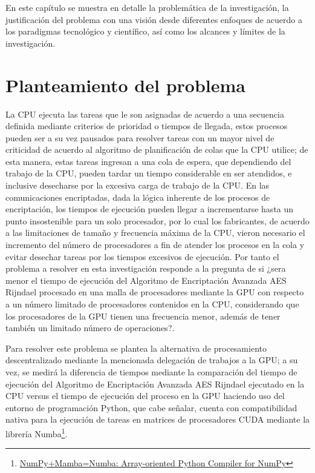 \documentclass[../main/main.tex]{subfiles}
\begin{document}
\espacio

  En este capítulo se muestra en detalle la problemática de la investigación, la justificación del problema con una visión desde diferentes enfoques de acuerdo a los paradigmas tecnológico y científico, así como los alcances y límites de la investigación.

  \section{Planteamiento del problema}

  La CPU ejecuta las tareas que le son asignadas de acuerdo a una secuencia definida mediante criterios de prioridad o tiempos de llegada, estos procesos pueden ser a su vez pausados para resolver tareas con un mayor nivel de criticidad de acuerdo al algoritmo de planificación de colas que la CPU utilice; de esta manera, estas tareas ingresan a una cola de espera, que dependiendo del trabajo de la CPU, pueden tardar un tiempo considerable en ser atendidos, e inclusive desecharse por la excesiva carga de trabajo de la CPU. En las comunicaciones encriptadas, dada la lógica inherente de los procesos de encriptación, los tiempos de ejecución pueden llegar a incrementarse hasta un punto insostenible para un solo procesador, por lo cual los fabricantes, de acuerdo a las limitaciones de tamaño y frecuencia máxima de la CPU, vieron necesario el incremento del número de procesadores a fin de atender los procesos en la cola y evitar desechar tareas por los tiempos excesivos de ejecución. Por tanto el problema a resolver en esta investigación responde a la pregunta de si ¿sera menor el tiempo de ejecución del Algoritmo de Encriptación Avanzada AES Rijndael procesado en una malla de procesadores mediante la GPU con respecto a un número limitado de procesadores contenidos en la CPU, considerando que los procesadores de la GPU tienen una frecuencia menor, además de tener también un limitado número de operaciones?.

  Para resolver este problema se plantea la alternativa de procesamiento descentralizado mediante la mencionada delegación de trabajos a la GPU; a su vez, se medirá la diferencia de tiempos mediante la comparación del tiempo de ejecución del Algoritmo de Encriptación Avanzada AES Rijndael ejecutado en la CPU versus el tiempo de ejecución del proceso en la GPU haciendo uso del entorno de programación Python, que cabe señalar, cuenta con compatibilidad nativa para la ejecución de tareas en matrices de procesadores CUDA mediante la librería Numba\footnote{\href{http://numba.pydata.org/numba-doc/latest/cuda/index.html}{NumPy+Mamba=Numba: Array-oriented Python Compiler for NumPy}}.
\end{document}
